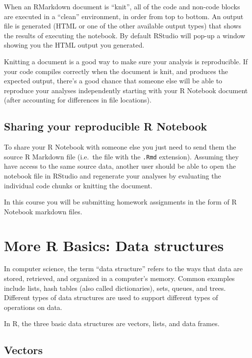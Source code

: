 \documentclass[]{book}
\theoremstyle{definition}
\theoremstyle{definition}
\theoremstyle{definition}
\theoremstyle{remark}
\begin{document}
When an RMarkdown document is ``knit'', all of the code and non-code
blocks are executed in a ``clean'' environment, in order from top to
bottom. An output file is generated (HTML or one of the other available
output types) that shows the results of executing the notebook. By
default RStudio will pop-up a window showing you the HTML output you
generated.

Knitting a document is a good way to make sure your analysis is
reproducible. If your code compiles correctly when the document is knit,
and produces the expected output, there's a good chance that someone
else will be able to reproduce your analyses independently starting with
your R Notebook document (after accounting for differences in file
locations).

\hypertarget{sharing-your-reproducible-r-notebook}{%
\section{Sharing your reproducible R
Notebook}\label{sharing-your-reproducible-r-notebook}}

To share your R Notebook with someone else you just need to send them
the source R Markdown file (i.e.~the file with the \texttt{.Rmd}
extension). Assuming they have access to the same source data, another
user should be able to open the notebook file in RStudio and regenerate
your analyses by evaluating the individual code chunks or knitting the
document.

In this course you will be submitting homework assignments in the form
of R Notebook markdown files.

\hypertarget{more-r-basics-data-structures}{%
\chapter{More R Basics: Data
structures}\label{more-r-basics-data-structures}}

In computer science, the term ``data structure'' refers to the ways that
data are stored, retrieved, and organized in a computer's memory. Common
examples include lists, hash tables (also called dictionaries), sets,
queues, and trees. Different types of data structures are used to
support different types of operations on data.

In R, the three basic data structures are vectors, lists, and data
frames.

\hypertarget{vectors}{%
\section{Vectors}\label{vectors}}
\end{document}
